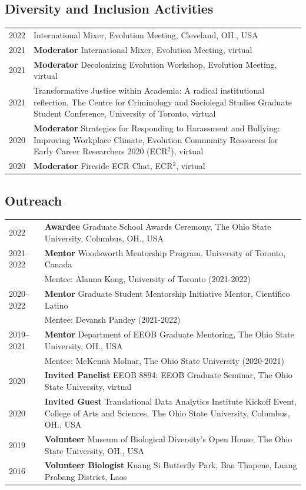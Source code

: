 \documentclass[11pt]{article}
\begin{document}
\subsection*{Diversity and Inclusion Activities}
\begin{longtable}{p{}  p{}}
2022& International Mixer, Evolution Meeting, Cleveland, OH., USA\\
2021& \textbf{Moderator} International Mixer, Evolution Meeting, virtual\\
2021& \textbf{Moderator} Decolonizing Evolution Workshop, Evolution Meeting, virtual\\
2021 & Transformative Justice within Academia: A radical institutional reflection, The Centre for Criminology and Sociolegal Studies Graduate Student Conference, University of Toronto, virtual\\
2020 &	\textbf{Moderator} Strategies for Responding to Harassment and Bullying: Improving Workplace Climate, Evolution Community Resources for Early Career Researchers 2020 (ECR$^2$), virtual\\
2020 &	\textbf{Moderator} Fireside ECR Chat, ECR$^2$, virtual\\
\end{longtable}


\subsection*{Outreach}
\begin{longtable}{p{}  p{}}
2022		& \textbf{Awardee} Graduate School Awards Ceremony, The Ohio State University, Columbus, OH., USA\\
2021--2022 & \textbf{Mentor} Woodsworth Mentorship Program, University of Toronto, Canada\\
		       &Mentee: Alanna Kong, University of Toronto (2021-2022)\\
2020--2022& \textbf{Mentor} Graduate Student Mentorship Initiative Mentor, Científico Latino\\
			&Mentee: Devansh Pandey (2021-2022)\\
2019--2021 & \textbf{Mentor} Department of EEOB Graduate Mentoring, The Ohio State University, OH., USA \\
		       &Mentee: McKenna Molnar, The Ohio State University (2020-2021)\\
2020 &	\textbf{Invited Panelist} EEOB 8894: EEOB Graduate Seminar, The Ohio State University, virtual\\
2020 &	\textbf{Invited Guest} Translational Data Analytics Institute Kickoff Event, College of Arts and Sciences, The Ohio State University, Columbus, OH., USA\\
2019 & \textbf{Volunteer} Museum of Biological Diversity’s Open House, The Ohio State University, OH., USA\\
2016 &  \textbf{Volunteer Biologist} Kuang Si Butterfly Park, Ban Thapene, Luang Prabang District, Laos\vspace{5pt}\\
\end{longtable}
\end{document}
